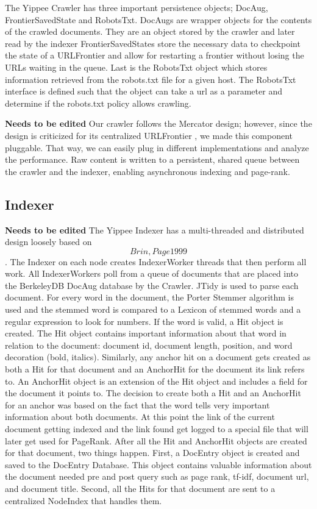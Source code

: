 \documentclass[11pt, letterpaper, oneside, twocolumn]{article}
\begin{document}
The Yippee Crawler has three important persistence objects; DocAug, FrontierSavedState and RobotsTxt.
DocAugs are wrapper objects for the contents of the crawled documents.
They are an object stored by the crawler and later read by the indexer
FrontierSavedStates store the necessary data to checkpoint the state of a URLFrontier and allow for restarting a frontier without losing the URLs waiting in the queue.
Last is the RobotsTxt object which stores information retrieved from the robots.txt file for a given host.
The RobotsTxt interface is defined such that the object can take a url as a parameter and determine if the robots.txt policy allows crawling.


\textbf{Needs to be edited}
Our crawler follows the Mercator design; however, since the design is
criticized for its centralized URLFrontier , we made this
component pluggable. That  way, we can easily plug in different implementations 
and analyze the  performance. Raw content  is  written to a persistent, shared queue  
between the crawler and  the indexer, enabling
asynchronous indexing and page-rank.

\subsection{Indexer}

\textbf{Needs to be edited}
The Yippee Indexer has a multi-threaded and distributed design loosely based on \[Brin, Page 1999\]\cite{pagerank}. 
The Indexer on each node creates IndexerWorker threads that then perform all work. 
All IndexerWorkers poll from a queue of documents that are placed into the BerkeleyDB DocAug database by the Crawler. 
JTidy is used to parse each document. 
For every word in the document, the Porter Stemmer algorithm is used and the stemmed word is compared to a Lexicon of stemmed words and a regular expression to look for numbers. 
If the word is valid, a Hit object is created. 
The Hit object contains important information about that word in relation to the document: document id, document length, position, and word decoration (bold, italics). 
Similarly, any anchor hit on a document gets created as both a Hit for that document and an AnchorHit for the document its link refers to. 
An AnchorHit object is an extension of the Hit object and includes a field for the document it points to. 
The decision to create both a Hit and an AnchorHit for an anchor was based on the fact that the word tells very important information about both documents. 
At this point the link of the current document getting indexed and the link found get logged to a special file that will later get used for PageRank. 
After all the Hit and AnchorHit objects are created for that document, two things happen. 
First, a DocEntry object is created and saved to the DocEntry Database. 
This object contains valuable information about the document needed pre and post query such as page rank, tf-idf, document url, and document title. 
Second, all the Hits for that document are sent to a centralized NodeIndex that handles them.
\end{document}
